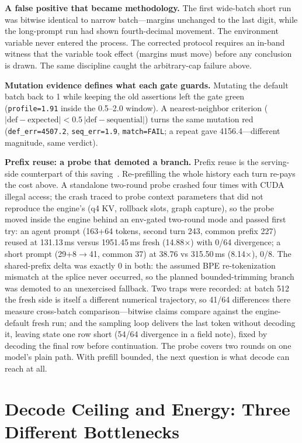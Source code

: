 \documentclass[letterpaper,twocolumn,10pt]{article}
\begin{document}
\textbf{A false positive that became methodology.} The first wide-batch short
run was bitwise identical to narrow batch---margins unchanged to the last
digit, while the long-prompt run had shown fourth-decimal movement. The
environment variable never entered the process. The corrected protocol
requires an in-band witness that the variable took effect (margins must move)
before any conclusion is drawn. The same discipline caught the arbitrary-cap
failure above.

\textbf{Mutation evidence defines what each gate guards.} Mutating the default
batch back to 1 while keeping the old assertions left the gate green
(\texttt{profile=1.91} inside the 0.5--2.0 window). A nearest-neighbor
criterion
($|\mathrm{def}-\mathrm{expected}| < 0.5\,|\mathrm{def}-\mathrm{sequential}|$)
turns the same mutation red (\texttt{def\_err=4507.2}, \texttt{seq\_err=1.9},
\texttt{match=FAIL}; a repeat gave 4156.4---different magnitude, same verdict).

\textbf{Prefix reuse: a probe that demoted a branch.} Prefix reuse is the
serving-side counterpart of this saving~\cite{promptcache2024}. Re-prefilling
the whole history each turn re-pays the cost above. A standalone two-round probe crashed
four times with CUDA illegal access; the crash traced to probe context
parameters that did not reproduce the engine's (q4 KV, rollback slots, graph
capture), so the probe moved inside the engine behind an env-gated two-round
mode and passed first try: an agent prompt (163+64 tokens, second turn 243,
common prefix 227) reused at 131.13\,ms versus 1951.45\,ms fresh
(14.88$\times$) with 0/64 divergence; a short prompt (29+8$\rightarrow$41,
common 37) at 38.76 vs 315.50\,ms (8.14$\times$), 0/8. The shared-prefix delta
was exactly 0 in both: the assumed BPE re-tokenization mismatch at the splice
never occurred, so the planned bounded-trimming branch was demoted to an
unexercised fallback. Two traps were recorded: at batch 512 the fresh side is itself a
different numerical trajectory, so 41/64 differences there measure
cross-batch comparison---bitwise claims compare against the engine-default
fresh run; and the sampling loop delivers the last token without decoding it,
leaving state one row short (54/64 divergence in a field note), fixed by
decoding the final row before continuation. The probe covers two rounds on
one model's plain path. With prefill bounded, the next question is what decode
can reach at all.

\section{Decode Ceiling and Energy: Three Different Bottlenecks}
\end{document}
